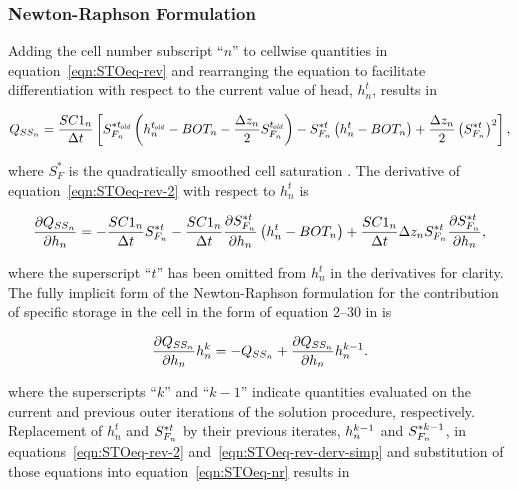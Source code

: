 \subsubsection{Newton-Raphson Formulation}

Adding the cell number subscript ``$n$'' to cellwise quantities in equation~\ref{eqn:STOeq-rev} and rearranging the equation to facilitate differentiation with respect to the current value of head, $h_n^t$, results in

\begin{equation}
	\label{eqn:STOeq-rev-2}
	Q_{SS_n} = \frac{SC1_n}{\Delta t} \left[S_{F_n}^{\ast t_\mathit{\kern -0.07em old}} \left( h_n^{t_\mathit{\kern -0.07em old}} - BOT_n - \frac{\Delta z_n}{2} S_{F_n}^{t_\mathit{\kern -0.07em old}} \right) -S_{F_n}^{\ast t} \left( h_n^t - BOT_n \right) + \frac{\Delta z_n}{2} \left( S_{F_n}^{\ast t} \right)^2 \right] ,
\end{equation}

\noindent where $S_F^\ast$ is the quadratically smoothed cell saturation \citep[see][Eq.~4--5]{modflow6gwf}. The derivative of equation~\ref{eqn:STOeq-rev-2} with respect to $h_n^t$ is 

\begin{equation}
	\label{eqn:STOeq-rev-derv-simp}
	\frac{\partial Q_{SS_n}}{\partial h_n} = -\frac{SC1_n}{\Delta t} S_{F_n}^{\ast t} - \frac{SC1_n}{\Delta t} \frac{\partial S_{F_n}^{\ast t}}{\partial h_n} \left( h_n^t - BOT_n \right) + \frac{SC1_n}{\Delta t} \Delta z_n S_{F_n}^{\ast t}  \frac{\partial S_{F_n}^{\ast t}}{\partial h_n} ,
\end{equation}

\noindent where the superscript ``$t$'' has been omitted from $h_n^t$ in the derivatives for clarity. The fully implicit form of the Newton-Raphson formulation for the contribution of specific storage in the cell in the form of equation 2--30 in \cite{modflow6gwf} is

\begin{equation}
	\label{eqn:STOeq-nr}
	\frac{\partial Q_{SS_n}}{\partial h_n} h_n^k = -Q_{SS_n} + \frac{\partial Q_{SS_n}}{\partial h_n} h_n^{k-1} .
\end{equation}

\noindent where the superscripts ``$k$'' and ``$k-1$'' indicate quantities evaluated on the current and previous outer iterations of the solution procedure, respectively. Replacement of $h_n^t$ and $S_{F_n}^{\ast t}$ by their previous iterates, $h_n^{k-1}$ and $S_{F_n}^{\ast k-1}$, in equations~\ref{eqn:STOeq-rev-2} and~\ref{eqn:STOeq-rev-derv-simp} and substitution of those equations into equation~\ref{eqn:STOeq-nr}  results in

